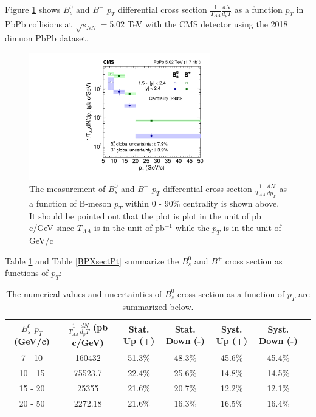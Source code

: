 Figure \ref{BmesonDataPt} shows $B^0_s$ and $B^+$ $p_T$ differential cross section $\frac{1}{T_{AA}} \frac{dN}{d_pT}$ as a function $p_T$ in PbPb collisions at $\sqrt{s_{NN}} = $5.02 TeV with the CMS detector using the 2018 dimuon PbPb dataset.

\begin{figure}[hbtp]
\begin{center}
\includegraphics[width=0.70\textwidth]{Figures/Chapter4/xsec_vsPt.pdf}
\caption{The measurement of $B^0_s$ and $B^+$ $p_T$ differential cross section $\frac{1}{T_{AA}} \frac{dN}{d p_T}$ as a function of B-meson $p_T$ within 0 - 90\% centrality is shown above. It should be pointed out that the plot is plot in the unit of pb c/GeV since $T_{AA}$ is in the unit of pb$^{-1}$ while the $p_T$ is in the unit of GeV/c}
\label{BmesonDataPt}
\end{center}
\end{figure}

Table \ref{BsXsectPt} and Table \ref{BPXsectPt} summarize the $B^0_s$ and $B^+$ cross section as functions of $p_T$:

\begin{table}[h]
\begin{center}
\caption{The numerical values and uncertainties of $B^0_s$ cross section as a function of $p_T$ are summarized below.}
\vspace{1em}
\label{BsXsectPt}
  \begin{tabular}{| c | c |c | c| c| c| c|}
    \hline
$B^0_s$ $p_T$ (GeV/c) &  $\frac{1}{T_{AA}} \frac{dN}{d_pT}$ (pb c/GeV) & Stat. Up (+)   & Stat. Down (-)  &  Syst. Up (+)  &  Syst. Down (-) \\
    \hline
    \hline
 7 - 10 &   160432  &  51.3\% & 48.3\% & 45.6\% & 45.4\% \\ 
 10 - 15 & 75523.7  & 22.4\%  & 25.6\%  & 14.8\% & 14.5\% \\ 
 15 - 20 &  25355 & 21.6\%   &  20.7\% & 12.2\% & 12.1\% \\ 
 20 - 50 &  2272.18    & 21.6\%  &  16.3\% & 16.5\% &16.4\% \\ 
    \hline
    \hline
\end{tabular}
\end{center}
\end{table}


